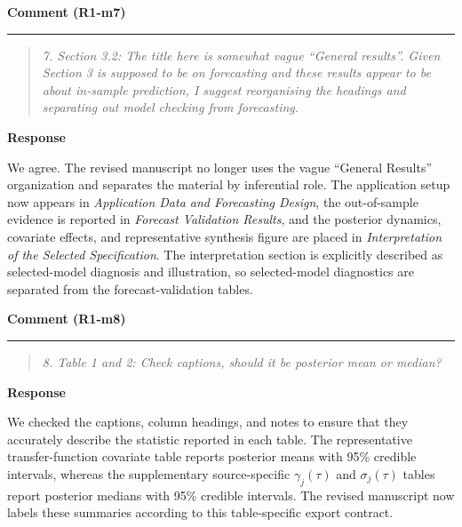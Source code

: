 \documentclass[11pt,letterpaper]{article}
\newcommand{\commentheading}[1]{%
  \vspace{6pt}\noindent\textbf{Comment (#1)}\par
  \vspace{2pt}\hrule\vspace{6pt}
}
\newenvironment{commentblock}{\begin{quote}\small\itshape}{\end{quote}}
\newcommand{\responseheading}{%
  \vspace{2pt}\noindent\textbf{Response}\par
}
\newenvironment{responsebox}{\begin{mdframed}[style=plainbox]}{\end{mdframed}}
\newcommand{\Ronem}[1]{R1-m#1}
\begin{document}
\commentheading{\Ronem{7}}
\begin{commentblock}
7. Section 3.2: The title here is somewhat vague “General results”. Given Section 3 is supposed to be on forecasting and these results appear to be about in-sample prediction, I suggest reorganising the headings and separating out model checking from forecasting.
\end{commentblock}
\responseheading
\begin{responsebox}
We agree. The revised manuscript no longer uses the vague ``General Results'' organization and separates the material by inferential role. The application setup now appears in \emph{Application Data and Forecasting Design}, the out-of-sample evidence is reported in \emph{Forecast Validation Results}, and the posterior dynamics, covariate effects, and representative synthesis figure are placed in \emph{Interpretation of the Selected Specification}. The interpretation section is explicitly described as selected-model diagnosis and illustration, so selected-model diagnostics are separated from the forecast-validation tables.
\end{responsebox}

\commentheading{\Ronem{8}}
\begin{commentblock}
8. Table 1 and 2: Check captions, should it be posterior mean or median?
\end{commentblock}
\responseheading
\begin{responsebox}
We checked the captions, column headings, and notes to ensure that they accurately describe the statistic reported in each table. The representative transfer-function covariate table reports posterior means with 95\% credible intervals, whereas the supplementary source-specific \(\gamma_j(\tau)\) and
\(\sigma_j(\tau)\) tables report posterior medians with 95\% credible intervals. The revised manuscript now labels these summaries according to this table-specific export contract.
\end{responsebox}
\end{document}
